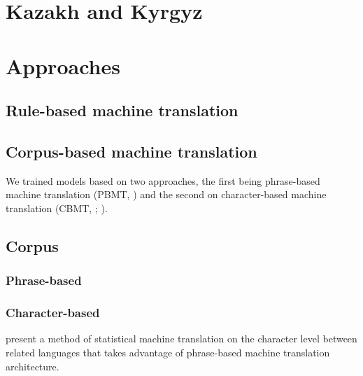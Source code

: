\documentclass[11pt]{article}
\begin{document}
\section{Kazakh and Kyrgyz}

\section{Approaches}

\subsection{Rule-based machine translation}

\cite{washingtonsalimzyantyers14}
\cite{washingtonipasovtyers12}

\subsection{Corpus-based machine translation}

We trained models based on two approaches, the first being phrase-based machine translation (PBMT, \cite{zens2002}) and the second on character-based machine translation (CBMT, \cite{nakov2012}; \cite{TiedemannEAMT2009}).

\subsection{Corpus}

\subsubsection{Phrase-based}

\subsubsection{Character-based }

\cite{nakov2012} present a method of statistical machine translation on the character level between related languages that takes advantage of phrase-based machine translation architecture. 

\end{document}
